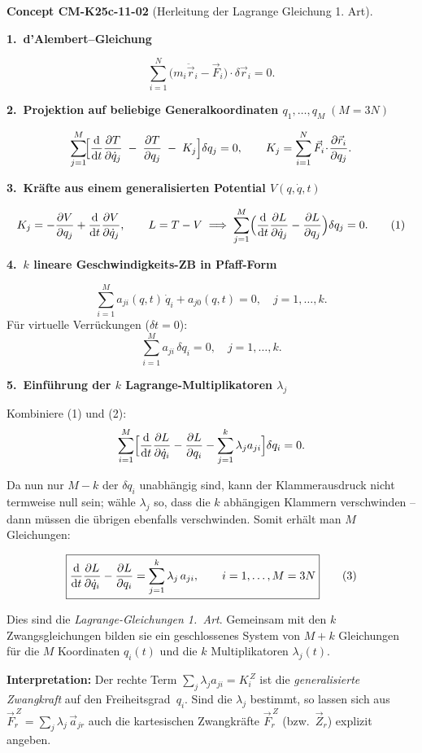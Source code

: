 \documentclass[10pt, letterpaper]{article}
\newcommand{\CustomHeading}[3]{%
  \par\medskip\noindent%
  \textbf{#1 #2} \textnormal{(#3)}.\enskip%
}
\newenvironment{CONC}[2]{\CustomHeading{Concept}{#1}{#2}}{}
\begin{document}
\begin{CONC}{CM-K25c-11-02}{Herleitung der Lagrange Gleichung 1. Art}
\textbf{1.\ d’Alembert–Gleichung}

\[
  \sum_{i=1}^{N}
    \bigl(m_i\ddot{\vec r}_i-\vec F_i\bigr)\!\cdot\!\delta\vec r_i=0 .
\]

\textbf{2.\ Projektion auf beliebige General­koordinaten
           $q_1,\dots,q_M\;(M=3N)$}

\[
  \sum_{j=1}^{M}
    \!\Bigl[
      \frac{\mathrm d}{\mathrm dt}
        \frac{\partial T}{\partial\dot q_j}
      \;-\;
      \frac{\partial T}{\partial q_j}
      \;-\;
      K_j
    \Bigr]\delta q_j = 0,
  \qquad
  K_j
  =\sum_{i=1}^{N}\vec F_i\!\cdot\!
     \frac{\partial\vec r_i}{\partial q_j}.
\]

\textbf{3.\ Kräfte aus einem generalisierten Potential
           $V(q,\dot q,t)$}

\[
  K_j
  =-\frac{\partial V}{\partial q_j}
    +\frac{\mathrm d}{\mathrm dt}
       \frac{\partial V}{\partial\dot q_j},
  \qquad
  L=T-V
  \;\Longrightarrow\;
  \sum_{j=1}^{M}
    \Bigl(
      \frac{\mathrm d}{\mathrm dt}
        \frac{\partial L}{\partial\dot q_j}
      -\frac{\partial L}{\partial q_j}
    \Bigr)\delta q_j = 0 .
\tag{1}
\]

\textbf{4.\ $k$ lineare Geschwindigkeits-ZB in Pfaff-Form}

\[
  \sum_{i=1}^{M}
    a_{ji}(q,t)\,\dot q_i + a_{j0}(q,t)=0,
  \quad
  j=1,\dots,k.
\]
Für virtuelle Verrückungen ($\delta t=0$):
\[
  \sum_{i=1}^{M}a_{ji}\,\delta q_i = 0,
  \quad j=1,\dots,k .
\tag{2}
\]

\textbf{5.\ Einführung der $k$ Lagrange-Multiplikatoren $\lambda_j$}

Kombiniere (1) und (2):
\[
  \sum_{i=1}^{M}
    \Bigl[
      \frac{\mathrm d}{\mathrm dt}
        \frac{\partial L}{\partial\dot q_i}
      -\frac{\partial L}{\partial q_i}
      -\sum_{j=1}^{k}\lambda_j a_{ji}
    \Bigr]\delta q_i = 0 .
\]

Da nun nur $M-k$ der $\delta q_i$ unabhängig sind, kann der Klammer­ausdruck
nicht termweise null sein; wähle $\lambda_j$ so, dass die $k$ abhängigen
Klammern verschwinden – dann müssen die übrigen ebenfalls verschwinden.
Somit erhält man $M$ Gleichungen:

\[
  \boxed{%
    \frac{\mathrm d}{\mathrm dt}
      \frac{\partial L}{\partial\dot q_i}
    -\frac{\partial L}{\partial q_i}
    =\sum_{j=1}^{k}\lambda_j\,a_{ji},
    \qquad
    i=1,\dots,M=3N
  }
  \tag{3}
\]

Dies sind die \emph{Lagrange-Gleichungen 1.\ Art}.  
Gemeinsam mit den $k$ Zwangsgleichungen bilden sie ein geschlossenes
System von $M+k$ Gleichungen für die $M$ Koordinaten $q_i(t)$ und die
$k$ Multiplikatoren $\lambda_j(t)$.

\bigskip
\noindent
\textbf{Interpretation:}  
Der rechte Term
$\displaystyle
  \sum_{j}\lambda_j a_{ji}
  =K_i^{\,Z}
$
ist die \emph{generalisierte Zwangkraft} auf den Freiheitsgrad~$q_i$.
Sind die $\lambda_j$ bestimmt, so lassen sich aus
\(
  \vec F_r^{\,Z}
  =\sum_{j}\lambda_j\,\vec a_{jr}
\)
auch die kartesischen Zwangkräfte $\vec F_r^{\,Z}$ (bzw.\ $\vec Z_r$)
explizit angeben.
\end{CONC}
\end{document}
